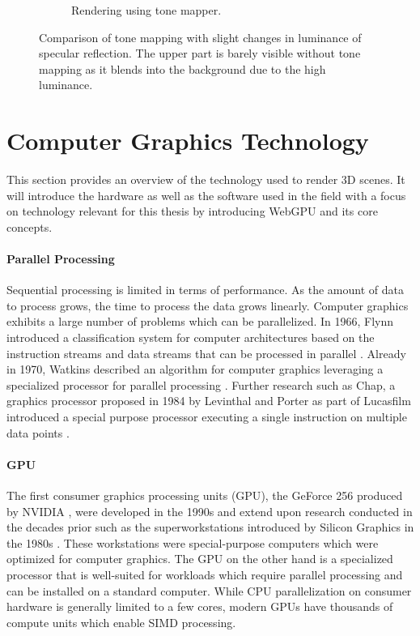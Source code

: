 \begin{figure}[H]
\begin{subfigure}[t]{0.3\textwidth}
    \caption{Rendering using tone mapper.}
    \label{fig:tone-mapping-applied}
  \end{subfigure}
  \hspace*{2cm}
  \caption{Comparison of tone mapping with slight changes in luminance of specular reflection. The upper part is barely visible without tone mapping as it blends into the background due to the high luminance.}
  \label{fig:tone-mapping}
\end{figure}

\section{Computer Graphics Technology}

This section provides an overview of the technology used to render 3D scenes. It will introduce the hardware as well as the software used in the field with a focus on technology relevant for this thesis by introducing \gls{WebGPU} and its core concepts.

\paragraph{Parallel Processing}

Sequential processing is limited in terms of performance. As the amount of data to process grows, the time to process the data grows linearly. Computer graphics exhibits a large number of problems which can be parallelized. In 1966, Flynn introduced a classification system for computer architectures based on the instruction streams and data streams that can be processed in parallel \cite{flynnTaxonomy,flynnTaxonomy2}. Already in 1970, Watkins described an algorithm for computer graphics leveraging a specialized processor for parallel processing \cite{surfaceAlgorithmProcessor}. Further research such as Chap, a  graphics processor proposed in 1984 by Levinthal and Porter as part of Lucasfilm introduced a special purpose processor executing a single instruction on multiple data points \cite{chapSIMDgpu}.

\paragraph{GPU}

The first consumer graphics processing units (\gls{GPU}), the GeForce 256 produced by NVIDIA \cite{evolutionOfGPU}, were developed in the 1990s and extend upon research conducted in the decades prior such as the superworkstations introduced by Silicon Graphics in the 1980s \cite{sigWorkstation}. These workstations were special-purpose computers which were optimized for computer graphics. The \gls{GPU} on the other hand is a specialized processor that is well-suited for workloads which require parallel processing and can be installed on a standard computer. While \gls{CPU} parallelization on consumer hardware is generally limited to a few cores, modern \glspl{GPU} have thousands of compute units which enable \gls{SIMD} processing.

